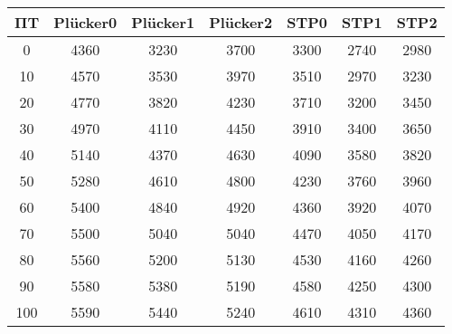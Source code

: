 \begin{tabular}{|c|c|c|c|c|c|c|}
\hline
ΠΤ&Plücker0&Plücker1&Plücker2&STP0&STP1&STP2\\\hline
\hline
0&4360&3230&3700&3300&2740&2980\\
\hline
10&4570&3530&3970&3510&2970&3230\\
\hline
20&4770&3820&4230&3710&3200&3450\\
\hline
30&4970&4110&4450&3910&3400&3650\\
\hline
40&5140&4370&4630&4090&3580&3820\\
\hline
50&5280&4610&4800&4230&3760&3960\\
\hline
60&5400&4840&4920&4360&3920&4070\\
\hline
70&5500&5040&5040&4470&4050&4170\\
\hline
80&5560&5200&5130&4530&4160&4260\\
\hline
90&5580&5380&5190&4580&4250&4300\\
\hline
100&5590&5440&5240&4610&4310&4360\\
\hline
\end{tabular}
